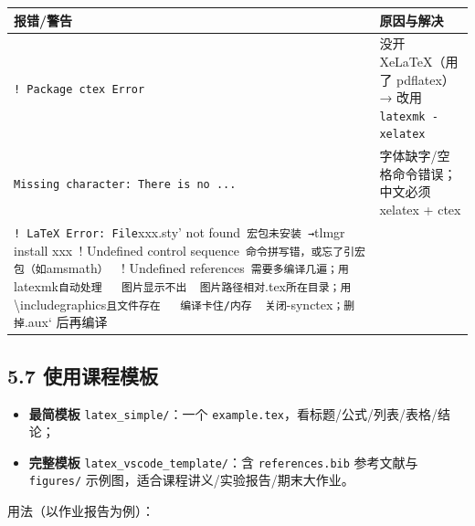 {\def\LTcaptype{none} %
\begin{longtable}[]{@{}
  >{\raggedright\arraybackslash}p{}
  >{\raggedright\arraybackslash}p{}@{}}
\toprule\noalign{}
\begin{minipage}[b]{\linewidth}\raggedright
报错/警告
\end{minipage} & \begin{minipage}[b]{\linewidth}\raggedright
原因与解决
\end{minipage} \\
\midrule\noalign{}
\endhead
\bottomrule\noalign{}
\endlastfoot
\texttt{!\ Package\ ctex\ Error} & 没开 XeLaTeX（用了 pdflatex）→ 改用
\texttt{latexmk\ -xelatex} \\
\texttt{Missing\ character:\ There\ is\ no\ ...} &
字体缺字/空格命令错误；中文必须 xelatex + ctex \\
\texttt{!\ LaTeX\ Error:\ File}xxx.sty' not
found\texttt{\textbar{}\ 宏包未安装\ →}tlmgr install
xxx\texttt{\textbar{}\ \textbar{}}! Undefined control
sequence\texttt{\textbar{}\ 命令拼写错，或忘了引宏包（如}amsmath\texttt{）\ \textbar{}\ \textbar{}}!
Undefined
references\texttt{\textbar{}\ 需要多编译几遍；用}latexmk\texttt{自动处理\ \textbar{}\ \textbar{}\ 图片显示不出\ \textbar{}\ 图片路径相对}.tex\texttt{所在目录；用}\textbackslash includegraphics\texttt{且文件存在\ \textbar{}\ \textbar{}\ 编译卡住/内存\ \textbar{}\ 关闭}-synctex\texttt{；删掉}.aux`
后再编译 & \\
\end{longtable}
}

\subsection{5.7
使用课程模板}\label{ux4f7fux7528ux8bfeux7a0bux6a21ux677f}

\begin{itemize}
\tightlist
\item
  \textbf{最简模板} \texttt{latex\_simple/}：一个
  \texttt{example.tex}，看标题/公式/列表/表格/结论；
\item
  \textbf{完整模板} \texttt{latex\_vscode\_template/}：含
  \texttt{references.bib} 参考文献与 \texttt{figures/}
  示例图，适合课程讲义/实验报告/期末大作业。
\end{itemize}

用法（以作业报告为例）：

\begin{Shaded}
\begin{Highlighting}[]
\end{Highlighting}
\end{Shaded}

